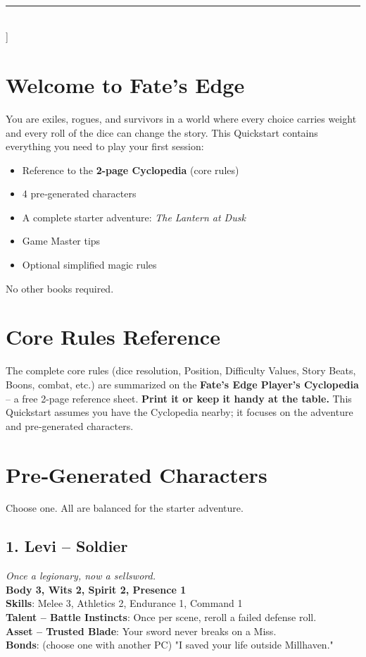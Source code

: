 \documentclass[10pt, twocolumn]{article}
\begin{document}
\twocolumn[
\centering
{\huge\bfseries Fate's Edge Quickstart}\\[0.5cm]
{\large Your first session in 15 minutes}\\[0.3cm]
\rule{\linewidth}{0.5pt}\\[0.5cm]
]

\section*{Welcome to Fate's Edge}
You are exiles, rogues, and survivors in a world where every choice carries weight and every roll of the dice can change the story. This Quickstart contains everything you need to play your first session:
\begin{itemize}
\item Reference to the \textbf{2-page Cyclopedia} (core rules)
\item 4 pre‑generated characters
\item A complete starter adventure: \textit{The Lantern at Dusk}
\item Game Master tips
\item Optional simplified magic rules
\end{itemize}
No other books required.

\section*{Core Rules Reference}
The complete core rules (dice resolution, Position, Difficulty Values, Story Beats, Boons, combat, etc.) are summarized on the \textbf{Fate's Edge Player's Cyclopedia} -- a free 2-page reference sheet.  
\textbf{Print it or keep it handy at the table.}  
This Quickstart assumes you have the Cyclopedia nearby; it focuses on the adventure and pre‑generated characters.

\section{Pre‑Generated Characters}
Choose one. All are balanced for the starter adventure.

\subsection*{1. Levi -- Soldier}
\textit{Once a legionary, now a sellsword.}\\
\textbf{Body 3, Wits 2, Spirit 2, Presence 1}\\
\textbf{Skills}: Melee 3, Athletics 2, Endurance 1, Command 1\\
\textbf{Talent -- Battle Instincts}: Once per scene, reroll a failed defense roll.\\
\textbf{Asset -- Trusted Blade}: Your sword never breaks on a Miss.\\
\textbf{Bonds}: (choose one with another PC) "I saved your life outside Millhaven."
\end{document}
